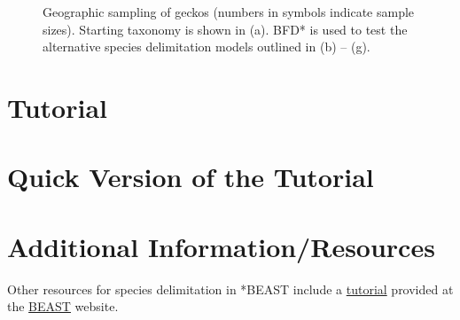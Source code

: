 \documentclass{article}
\newcommand{\program}[1]{#1\xspace}
\newcommand{\beast}{\href{http://beast2.org}{\program{BEAST}}\xspace}
\begin{document}
    \begin{figure}[htbp]
        \centering
        \caption{Geographic sampling of geckos (numbers in symbols indicate sample sizes). Starting taxonomy is shown in (a). BFD* is used to test the alternative species delimitation models outlined in (b) -- (g).}
        \label{fig:map}
    \end{figure}

\section{Tutorial}
\newcommand{\step}[2]{\addtocounter{stepCounter}{1} {\bf \hypertarget{step\arabic{stepCounter}}{Step \arabic{stepCounter}:}}\xspace #2\par}
\newcommand{\intermediate}[1]{#1}


\newpage
\section{Quick Version of the Tutorial}
\setcounter{stepCounter}{0}
\renewcommand{\step}[2]{\addtocounter{stepCounter}{1} {\bf \hyperlink{step\arabic{stepCounter}}{Step \arabic{stepCounter}}:}\xspace #1\par}
\renewcommand{\intermediate}[1]{}


\newpage
\section{Additional Information/Resources}
Other resources for species delimitation in *BEAST include a
\href{http://beast2.org}{tutorial} provided at the \beast website.  

\newpage

\end{document}
